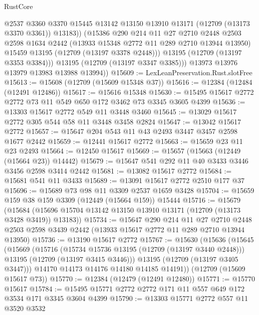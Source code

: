\begin{lexlean}{RustCore}
\begin{coremodule}
                @2537
                @3360
                @3370
                @15445
                @13142
                @13150
                @13910
                @13171
                (@12709 (@13173 @3370 @3361))
                @13183))
            (@15386
              @290
              @214
              @11
              @27
              @2710
              @2448
              @2503
              @2598
              @1634
              @2442
              (@13933 @15348 @2772 @11 @289 @2710 @13944 @13950)
              @15459
              @13195
              (@12709 (@13197 @3378 @2448)))
            @13195
            (@12709 (@13197 @3353 @3384)))
          @13195
          (@12709 (@13197 @3347 @3385)))
        @13973
        @13976
        @13979
        @13983
        @13988
        @13994))
@15609 := LexLeanPreservation.Rust.slotFree
@15613 := @15608 (@12709 (@15609 @15348 @37))
@15616 := @12384 (@12484 (@12491 @12486))
@15617 := @15616 @15348
@15630 := @15495 @15617 @2772 @2772 @73 @11 @549 @650 @172 @3462 @73 @3345 @3605 @4399
@15636 := @13303 @15617 @2772 @549 @11 @3448 @3460
@15645 := @13029 @15617 @2772 @305 @544 @58 @11 @3448 @3458 @2824
@15647 := @13042 @15617 @2772
@15657 := @15647 @204 @543 @11 @43 @2493 @3447 @3457 @2598 @1677 @2442
@15659 := @12441 @15617 @2772
@15663 := @15659 @23 @11 @23 @2493
@15664 := @12450 @15617
@15669 := @15657 (@15663 (@12449 (@15664 @23)) @14442)
@15679 := @15647 @541 @292 @11 @40 @3433 @3446 @3456 @2598 @3414 @2442
@15681 := @13082 @15617 @2772
@15684 := @15681 @541 @11 @3433
@15689 := @13091 @15617 @2772 @2510 @177 @37
@15696 := @15689 @73 @98 @11 @3309 @2537 @1659 @3428
@15704 := @15659 @159 @38 @159 @3309 (@12449 (@15664 @159)) @15444
@15716 := @15679
    (@15684 (@15696 @15704 @13142 @13150 @13910 @13171 (@12709 (@13173 @3428 @3419)) @13183))
@15734 := @15647
    @290
    @214
    @11
    @27
    @2710
    @2448
    @2503
    @2598
    @3439
    @2442
    (@13933 @15617 @2772 @11 @289 @2710 @13944 @13950)
@15736 := @13190 @15617 @2772
@15767 := @15630
    (@15636
      (@15645
        (@15669
          (@15716
            (@15734 @15736 @13195 (@12709 (@13197 @3440 @2448)))
            @13195
            (@12709 (@13197 @3415 @3446)))
          @13195
          (@12709 (@13197 @3405 @3447)))
        @14170
        @14173
        @14176
        @14180
        @14185
        @14191))
    (@12709 (@15609 @15617 @73))
@15770 := @12384 (@12479 (@12491 @12480))
@15771 := @15770 @15617
@15784 := @15495 @15771 @2772 @2772 @171 @11 @557 @649 @172 @3534 @171 @3345 @3604 @4399
@15790 := @13303 @15771 @2772 @557 @11 @3520 @3532

\end{coremodule}
\end{lexlean}
